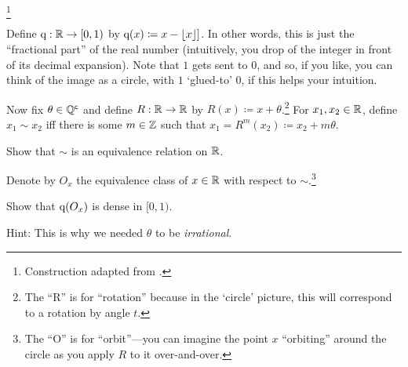 \begin{exm}\footnote{Construction adapted from \cite[pg.~407]{Pugh}.}\label{exm5.2.47}

Define $\mathrm{q} :\mathbb{R} \rightarrow [0,1)$ by $\mathrm{q} (x)\coloneqq x-\lfloor x\rfloor ]$.  In other words, this is just the ``fractional part'' of the real number (intuitively, you drop of the integer in front of its decimal expansion).  Note that $1$ gets sent to $0$, and so, if you like, you can think of the image as a circle, with $1$ `glued-to' $0$, if this helps your intuition.

Now fix $\theta \in \mathbb{Q} ^{\mathsf{c}}$ and define $R:\mathbb{R} \rightarrow \mathbb{R}$ by $R(x)\coloneqq x+\theta$.\footnote{The ``R'' is for ``rotation'' because in the `circle' picture, this will correspond to a rotation by angle $t$.}  For $x_1,x_2\in \mathbb{R}$, define $x_1\sim x_2$ iff there is some $m\in \mathbb{Z}$ such that $x_1=R^m(x_2)\coloneqq x_2+m\theta$.
\begin{exr}
Show that $\sim$ is an equivalence relation on $\mathbb{R}$.
\end{exr}
Denote by $O_x$ the equivalence class of $x\in \mathbb{R}$ with respect to $\sim$.\footnote{The ``O'' is for ``orbit''---you can imagine the point $x$ ``orbiting'' around the circle as you apply $R$ to it over-and-over.}
\begin{exr}
Show that $\mathrm{q} (O_x)$ is dense in $[0,1)$.
\begin{rmk}
Hint:  This is why we needed $\theta$ to be \emph{irrational}.
\end{rmk}
\end{exr}


\end{exm}
